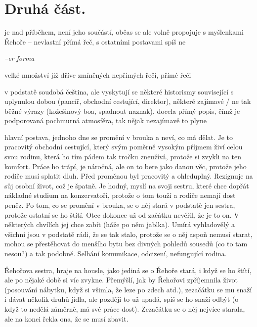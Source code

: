\documentclass{article}
\begin{document}
\section{Druhá část.}
\begin{description}
    \setlength\itemsep{0.15em}
    \item[vypravěč:] je nad příběhem, není jeho součástí, občas se ale volně propojuje s myšlenkami Řehoře -- nevlastní přímá řeč, s ostatními postavami spíš ne
    \item[vyprávěcí způsoby:] \textit{--er forma}
    \item[typy promluv:] velké množství již dříve zmíněných nepřímých řečí, přímé řeči
    \item[jazyková stránka:] v podstatě soudobá čeština, ale vyskytují se některé historismy související s uplynulou dobou (pancíř, obchodní cestující, direktor), některé zajímavé / ne tak běžné výrazy (kožešinový boa, spadnout naznak), docela přímý popis, čímž je podporovaná pochmurná atmosféra, tak nějak nezajímavě to plyne
    \item[postavy:]
        \begin{description}
            \setlength\itemsep{0.15em}
            \item[Řehoř Samsa,] hlavní postava, jednoho dne se promění v brouka a neví, co má dělat. Je to pracovitý obchodní cestující, který svým poměrně vysokým příjmem živí celou svou rodinu, která ho tím pádem tak tročku zneužívá, protože si zvykli na ten komfort. Práce ho trápí, je náročná, ale on to bere jako danou věc, protože jeho rodiče musí splatit dluh. Před proměnou byl pracovitý a ohleduplný. Rezignuje na sůj osobní život, což je špatně. Je hodný, myslí na svoji sestru, které chce dopřát nákladné studium na konzervatoři, protože o tom touží a rodiče nemají dost peněz. Po tom, co se promění v brouka, se o něj stará v podstatě jen sestra, protože ostatní se ho štítí. Otec dokonce už od začátku nevěřil, že je to on. V některých chvílích jej chce zabít (háže po něm jablka). Umírá vyhladovělý a všichni jsou v podstatě rádi, že se tak stalo, protože se o něj aspoň nemusí starat, mohou se přestěhovat do menšího bytu bez divných pohledů sousedů (co to tam nesou?) a tak podobně. Selhání komunikace, odcizení, nefungující rodina.
            \item[Markéta,] Řehořova sestra, hraje na housle, jako jediná se o Řehoře stará, i když se ho štítí, ale po nějaké době si víc zvykne. Přemýšlí, jak by Řehořovi zpříjemnila život (posouvání nábytku, když si všimla, že leze po zdech atd.), zezačátku se mu snaží i dávat několik druhů jídla, ale později to už upadá, spíš se ho snaží odbýt (o když to nedělá záměrně, má své práce dost). Zezačátku se o něj nejvíce starala, ale na konci řekla ona, že se  musí zbavit.

\end{description}
\end{description}
\end{document}

